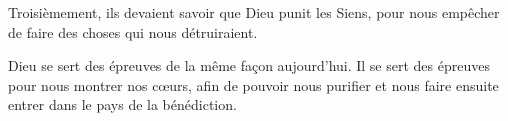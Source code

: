 Troisièmement, ils devaient savoir que Dieu punit les Siens,
 pour nous empêcher de faire des choses qui nous détruiraient.

Dieu se sert des épreuves de la même façon aujourd'hui.
 Il se sert des épreuves pour nous montrer nos cœurs,
 afin de pouvoir nous purifier et nous faire ensuite entrer
 dans le pays de la bénédiction. 

\dvrule





